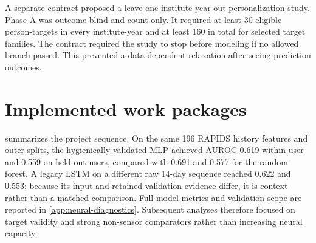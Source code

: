 \documentclass[a4paper,11pt,oneside]{report}
\begin{document}
A separate contract proposed a leave-one-institute-year-out personalization study.
Phase A was outcome-blind and count-only. It required at least 30 eligible
person-targets in every institute-year and at least 160 in total for selected target
families. The contract required the study to stop before modeling if no allowed
branch passed. This prevented a data-dependent relaxation after seeing prediction
outcomes.

\section{Implemented work packages}
\label{sec:implementation}

 summarizes the project sequence. On the same 196
RAPIDS history features and outer splits, the hygienically validated MLP achieved
AUROC 0.619 within user and 0.559 on held-out users, compared with 0.691 and 0.577
for the random forest. A legacy LSTM on a different raw 14-day sequence reached
0.622 and 0.553; because its input and retained validation evidence differ, it is
context rather than a matched comparison. Full model metrics and validation scope
are reported in \cref{app:neural-diagnostics}. Subsequent analyses therefore focused
on target validity and strong non-sensor comparators rather than increasing neural
capacity.
\end{document}
